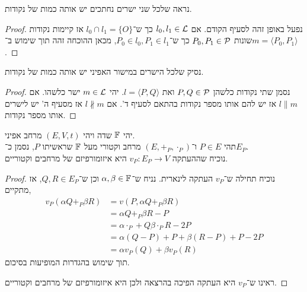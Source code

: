 \subquestion{}
נראה שלכל שני ישרים נחתכים יש אותה כמות של נקודות.
\begin{proof}
	נפעל באופן זהה לסעיף הקודם.
	אם $l_0, l_1 \in \mathcal{L}$ כך ש־$l_0 \cap l_1 = \{ O \}$ אז קיימות נקודות שונות $P_0, P_1 \in \mathcal{P}$ כך ש־$P_0 \in l_0, P_1 \in l_1$, מכאן ההוכחה זהה תוך שימוש ב־$m = \langle P_0, P_1 \rangle$.
\end{proof}

\subquestion{}
נסיק שלכל הישרים במישור האפיני יש אותה כמות של נקודות.
\begin{proof}
	נסמן שתי נקודות כלשהן $P, Q \in \mathcal{P}$ ואת $l = \langle P, Q \rangle$.
	יהי $m \in \mathcal{L}$ ישר כלשהו.
	אם $l \parallel m$ אז יש להם אותו מספר נקודות בהתאם לסעיף ד'.
	אם $l \not\parallel m$ אז מסעיף ה' יש לישרים אותו מספר נקודות.
\end{proof}

\question{}
יהי $\mathbb{F}$ שדה ויהי $(E, V, t)$ מרחב אפיני. \\
תהי $P \in E$ ו־$(E, +_P, \cdot_P)$ מרחב וקטורי מעל $\mathbb{F}$ שראשיתו $P$, נסמן כ־$E_P$. \\
נוכיח שההעתקה $v_P : E_P \to V$ היא איזומורפיזם של מרחבים וקטוריים.
\begin{proof}
	נוכיח תחילה ש־$v_P$ העתקה לינארית.
	נניח ש־$\alpha, \beta \in \mathbb{F}$ וכן ש־$Q, R \in E_P$, אז מתקיים,
	\begin{align*}
		v_P(\alpha Q +_P \beta R)
		& = v(P, \alpha Q +_P \beta R) \\
		& = \alpha Q +_P \beta R - P \\
		& = \alpha \cdot_P + Q \beta \cdot_P R - 2P \\
		& = \alpha (Q - P) + P + \beta (R - P) + P - 2P \\
		& = \alpha v_P(Q) + \beta v_P(R)
	\end{align*}
	תוך שימוש בהגדרות המופיעות בסיכום.

	ראינו ש־$v_P$ היא העתקה הפיכה בהרצאה ולכן היא איזומורפיזם של מרחבים וקטוריים.
\end{proof}

